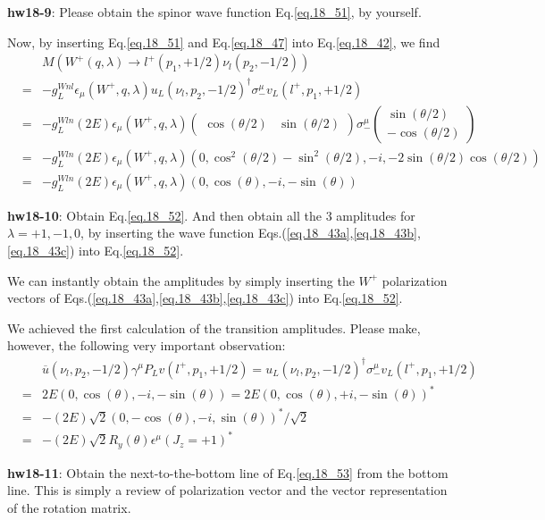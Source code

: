\documentclass[12pt]{article}
\def\eps{\epsilon}
\def\lmd{\lambda}
\def\th{\theta}
\begin{document}
{\bf hw18-9}: Please obtain the spinor wave function Eq.\ref{eq.18_51}, by yourself.

Now, by inserting Eq.\ref{eq.18_51} and Eq.\ref{eq.18_47} into Eq.\ref{eq.18_42}, we find
\begin{eqnarray}
    &&M(W^+(q,\lmd) \to l^+(p_1,+1/2) \nu_l(p_2,-1/2)) \\ 
    &=& -g_L^{Wnl} \eps_\mu(W^+,q,\lmd) u_L(\nu_l,p_2,-1/2)^\dagger \sigma_-^\mu v_L(l^+,p_1,+1/2) \\
    &=& -g_L^{Wln} (2E) \eps_\mu(W^+,q,\lmd) 
    \begin{pmatrix}
        \cos(\th/2)&\sin(\th/2)
    \end{pmatrix}
    \sigma_-^\mu
    \begin{pmatrix}
        \sin(\th/2)\\ -\cos(\th/2)
    \end{pmatrix}\\
    &=& -g_L^{Wln} (2E)
    \eps_\mu(W^+,q,\lmd)
    ( 0, \cos^2(\th/2)-\sin^2(\th/2), -i, -2\sin(\th/2)\cos(\th/2) ) \\
    &=&-g_L^{Wln} (2E)
    \eps_\mu(W^+,q,\lmd)
    ( 0, \cos(\theta), -i, -\sin(\theta) ) \label{eq.18_52}
\end{eqnarray}

{\bf hw18-10}: Obtain Eq.\ref{eq.18_52}. And then obtain all the $3$ amplitudes for $\lmd= +1, -1, 0$, by inserting the wave function Eqs.(\ref{eq.18_43a},\ref{eq.18_43b},\ref{eq.18_43c}) into Eq.\ref{eq.18_52}.

We can instantly obtain the amplitudes by simply inserting the $W^+$
polarization vectors of Eqs.(\ref{eq.18_43a},\ref{eq.18_43b},\ref{eq.18_43c}) into Eq.\ref{eq.18_52}.

We achieved the first calculation of the transition amplitudes.
Please make, however, the following very important observation:
\begin{eqnarray}
    &&{\overline u}(\nu_l,p_2,-1/2) \gamma^\mu P_L v(l^+,p_1,+1/2) 
    =u_L(\nu_l,p_2,-1/2)^\dagger \sigma_-^\mu v_L(l^+,p_1,+1/2) \\ 
    &=& 2E ( 0, \cos(\theta), -i, -\sin(\theta) ) = 2E( 0, \cos(\theta), +i, -\sin(\theta) )^* \\
    &=& -(2E)\sqrt{2} ( 0, -\cos(\theta), -i, \sin(\theta) )^*/\sqrt{2}\\
    &=&-(2E)\sqrt{2} R_y(\theta) \eps^\mu(J_z=+1)^* \label{eq.18_53}
\end{eqnarray}

{\bf hw18-11}: Obtain the next-to-the-bottom line of Eq.\ref{eq.18_53} from the bottom line. This is simply a review of polarization vector and the vector
representation of the rotation matrix.
\end{document}
